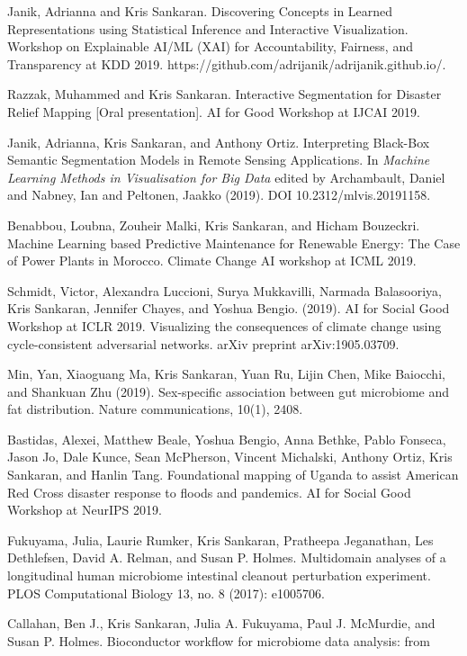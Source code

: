 \documentclass[letterpaper]{article}
\renewenvironment{itemize}{
  \begin{list}{}{
    \setlength{\leftmargin}{1.5em}
  }
}{
  \end{list}
}
\begin{document}
\begin{itemize}
\begin{itemize}
\item Janik, Adrianna and Kris Sankaran. Discovering Concepts in Learned Representations using Statistical Inference and Interactive Visualization. Workshop on Explainable AI/ML (XAI) for Accountability, Fairness, and Transparency at KDD 2019. https://github.com/adrijanik/adrijanik.github.io/.
  \item Razzak, Muhammed and Kris Sankaran. Interactive Segmentation for Disaster Relief Mapping [Oral presentation]. AI for Good Workshop at IJCAI 2019.
  \item Janik, Adrianna, Kris Sankaran, and Anthony Ortiz. Interpreting Black-Box Semantic Segmentation Models in Remote Sensing Applications. In \textit{Machine Learning Methods in Visualisation for Big Data} edited by Archambault, Daniel and Nabney, Ian and Peltonen, Jaakko (2019). DOI 10.2312/mlvis.20191158.
  \item Benabbou, Loubna, Zouheir Malki, Kris Sankaran, and Hicham Bouzeckri. Machine Learning based Predictive Maintenance for Renewable Energy: The Case of Power Plants in Morocco. Climate Change AI workshop at ICML 2019.
  \item Schmidt, Victor, Alexandra Luccioni, Surya Mukkavilli, Narmada Balasooriya, Kris Sankaran, Jennifer Chayes, and Yoshua Bengio. (2019). AI for Social Good Workshop at ICLR 2019. Visualizing the consequences of climate change using cycle-consistent adversarial networks. arXiv preprint arXiv:1905.03709.
  \item Min, Yan, Xiaoguang Ma, Kris Sankaran, Yuan Ru, Lijin Chen, Mike Baiocchi, and Shankuan Zhu (2019). Sex-specific association between gut microbiome and fat distribution. Nature communications, 10(1), 2408.
  \item Bastidas, Alexei, Matthew Beale, Yoshua Bengio, Anna Bethke, Pablo Fonseca, Jason Jo, Dale Kunce, Sean McPherson, Vincent Michalski, Anthony Ortiz, Kris Sankaran, and Hanlin Tang. Foundational mapping of Uganda to assist American Red Cross disaster response to floods and pandemics. AI for Social Good Workshop at NeurIPS 2019.
  \item Fukuyama, Julia, Laurie Rumker, Kris Sankaran, Pratheepa Jeganathan, Les
    Dethlefsen, David A. Relman, and Susan P. Holmes. Multidomain analyses of a
    longitudinal human microbiome intestinal cleanout perturbation experiment.
    PLOS Computational Biology 13, no. 8 (2017): e1005706.
  \item Callahan, Ben J., Kris Sankaran, Julia A. Fukuyama, Paul J. McMurdie, and
    Susan P. Holmes. Bioconductor workflow for microbiome data analysis: from

\end{itemize}
\end{itemize}
\end{document}
